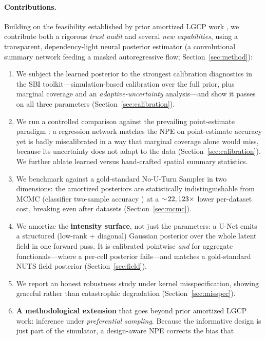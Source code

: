 \documentclass[11pt]{article}
\begin{document}
\paragraph{Contributions.}
Building on the feasibility established by prior amortized LGCP work
\citep{wang2025inference}, we contribute both a rigorous \emph{trust audit} and
several \emph{new capabilities}, using a transparent, dependency-light neural
posterior estimator (a convolutional summary network feeding a masked
autoregressive flow; Section~\ref{sec:method}):
\begin{enumerate}\itemsep2pt
\item We subject the learned posterior to the strongest calibration diagnostics in
the SBI toolkit---simulation-based calibration over the full prior, plus marginal
coverage and an \emph{adaptive-uncertainty} analysis---and show it passes on all
three parameters (Section~\ref{sec:calibration}).
\item We run a controlled comparison against the prevailing point-estimate
paradigm \citep{vihrs2022using}: a regression network matches the NPE on
point-estimate accuracy yet is badly miscalibrated in a way that marginal coverage
alone would miss, because its uncertainty does not adapt to the data
(Section~\ref{sec:calibration}). We further ablate learned versus hand-crafted
spatial summary statistics.
\item We benchmark against a gold-standard No-U-Turn Sampler in two dimensions:
the amortized posteriors are statistically indistinguishable from MCMC (classifier
two-sample accuracy \CtstMean{}) at a $\sim\!22,123\times$ lower per-dataset
cost, breaking even after \BreakEven{} datasets (Section~\ref{sec:mcmc}).
\item We amortize the \textbf{intensity surface}, not just the parameters: a
U-Net emits a structured (low-rank + diagonal) Gaussian posterior over the whole
latent field in one forward pass. It is calibrated pointwise \emph{and} for
aggregate functionals---where a per-cell posterior fails---and matches a
gold-standard NUTS field posterior (Section~\ref{sec:field}).
\item We report an honest robustness study under kernel misspecification, showing
graceful rather than catastrophic degradation (Section~\ref{sec:misspec}).
\item \textbf{A methodological extension} that goes beyond prior amortized LGCP
work: inference under \emph{preferential sampling}. Because the informative
design is just part of the simulator, a design-aware NPE corrects the bias that

\end{enumerate}
\end{document}
